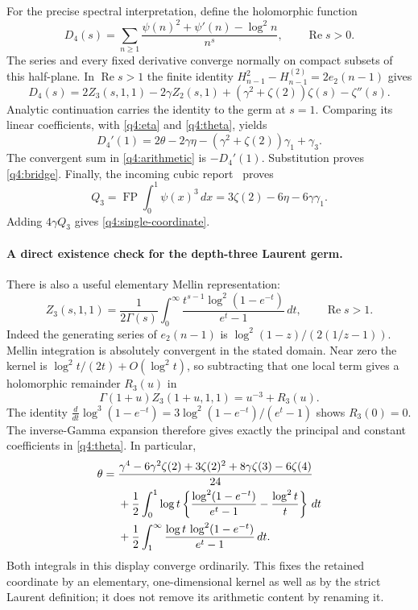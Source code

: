 \documentclass[11pt,a4paper]{article}
\numberwithin{equation}{section}
\theoremstyle{definition}
\theoremstyle{remark}
\begin{document}
For the precise spectral interpretation, define the holomorphic function
\[
 D_4(s)=\sum_{n\geq1}
       \frac{\psi(n)^2+\psi'(n)-\log^2n}{n^s},
       \qquad\operatorname{Re}s>0.
\]
The series and every fixed derivative converge normally on compact
subsets of this half-plane.  In $\operatorname{Re}s>1$ the finite identity
$H_{n-1}^2-H_{n-1}^{(2)}=2e_2(n-1)$ gives
\begin{equation}\label{q4:Didentity}
 D_4(s)=2Z_3(s,1,1)-2\gamma Z_2(s,1)
                  +(\gamma^2+\zeta(2))\zeta(s)-\zeta''(s).
\end{equation}
Analytic continuation carries the identity to the germ at $s=1$.
Comparing its linear coefficients, with \eqref{q4:eta} and
\eqref{q4:theta}, yields
\[
 D_4'(1)=2\theta-2\gamma\eta
                    -(\gamma^2+\zeta(2))\gamma_1+\gamma_3.
\]
The convergent sum in \eqref{q4:arithmetic} is $-D_4'(1)$.
Substitution proves \eqref{q4:bridge}.  Finally, the incoming cubic
report~\cite{IncomingCubic}
proves
\[
 Q_3=\operatorname{FP}\int_0^1\psi(x)^3\,dx
    =3\zeta(2)-6\eta-6\gamma\gamma_1.
\]
Adding $4\gamma Q_3$ gives \eqref{q4:single-coordinate}.

\paragraph{A direct existence check for the depth-three Laurent germ.}
There is also a useful elementary Mellin representation:
\begin{equation}\label{q4:heightone-mellin}
 Z_3(s,1,1)=\frac1{2\Gamma(s)}\int_0^\infty
     \frac{t^{s-1}\log^2(1-e^{-t})}{e^t-1}\,dt,
     \qquad\operatorname{Re}s>1.
\end{equation}
Indeed the generating series of $e_2(n-1)$ is
$\log^2(1-z)/(2(1/z-1))$.  Mellin integration is absolutely convergent
in the stated domain.  Near zero the kernel is
$\log^2t/(2t)+O(\log^2t)$, so subtracting that one local term gives
a holomorphic remainder $R_3(u)$ in
\[
 \Gamma(1+u)Z_3(1+u,1,1)=u^{-3}+R_3(u).
\]
The identity
$\frac{d}{dt}\log^3(1-e^{-t})=3\log^2(1-e^{-t})/(e^t-1)$
shows $R_3(0)=0$.  The inverse-Gamma expansion therefore gives exactly
the principal and constant coefficients in \eqref{q4:theta}.  In
particular,
\begin{align}\label{q4:theta-kernel}
 \theta={}&\frac{\gamma^4-6\gamma^2\zeta(2)+3\zeta(2)^2
                       +8\gamma\zeta(3)-6\zeta(4)}{24}\notag\\
 &+\frac12\int_0^1\log t
       \left\{\frac{\log^2(1-e^{-t})}{e^t-1}
                        -\frac{\log^2t}{t}\right\}\,dt\notag\\
 &+\frac12\int_1^\infty
       \frac{\log t\,\log^2(1-e^{-t})}{e^t-1}\,dt.
\end{align}
Both integrals in this display converge ordinarily.  This fixes the
retained coordinate by an elementary, one-dimensional kernel as well as
by the strict Laurent definition; it does not remove its arithmetic
content by renaming it.
\end{document}
